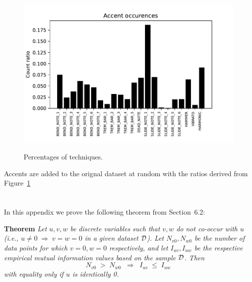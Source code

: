 \documentclass[twoside,11pt]{article}
\newcommand{\dataset}{{\cal D}}
\begin{document}
\begin{figure}[htbp]
  \centering
\includegraphics[clip, width=0.8\linewidth]{accent_probability.pdf}
\label{fig:accentoccurence}
\caption{Percentages of techniques.}
\end{figure} 
Accents are added to the orignal dataset at random with the ratios derived from Figure~\ref{fig:accentoccurence} 





\newpage

\appendix
\section{}
\label{app:theorem}



In this appendix we prove the following theorem from
Section~6.2:

\noindent
{\bf Theorem} {\it Let $u,v,w$ be discrete variables such that $v, w$ do
not co-occur with $u$ (i.e., $u\neq0\;\Rightarrow \;v=w=0$ in a given
dataset $\dataset$). Let $N_{v0},N_{w0}$ be the number of data points for
which $v=0, w=0$ respectively, and let $I_{uv},I_{uw}$ be the
respective empirical mutual information values based on the sample
$\dataset$. Then
\[
	N_{v0} \;>\; N_{w0}\;\;\Rightarrow\;\;I_{uv} \;\leq\;I_{uw}
\]
with equality only if $u$ is identically 0.} \hfill\BlackBox
\end{document}
